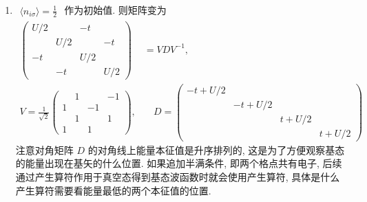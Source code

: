 \documentclass[../../main.tex]{subfiles}
\begin{document}
\begin{enumerate}
  \item $\begin{aligned}
    \langle n_{i\sigma}\rangle = \frac{1}{2}
  \end{aligned}$ 作为初始值. 则矩阵变为
  \begin{align*}
    \begin{pmatrix}
      U/2 &  & -t & \\
       & U/2 & & -t\\
      -t & & U/2 &  \\
       & -t &  & U/2
    \end{pmatrix} &= VDV^{-1},\\
    V = \frac{1}{\sqrt{2}}\begin{pmatrix}
        & 1 &    & -1\\
      1 &   & -1 &   \\
        & 1 &    &  1\\
      1 &   & 1  &
    \end{pmatrix},&\quad D = \begin{pmatrix}
      -t + U/2 &  &  & \\
       & -t + U/2 & & \\
       & & t + U/2 &  \\
       & & & t + U/2
    \end{pmatrix}
  \end{align*}
  注意对角矩阵 $D$ 的对角线上能量本征值是升序排列的, 这是为了方便观察基态的能量出现在基矢的什么位置. 如果追加半满条件, 即两个格点共有{\color{red}{两个}}电子, 后续通过产生算符作用于真空态得到基态波函数时就会使用{\color{red}{两个}}产生算符, 具体是什么产生算符需要看能量最低的两个本征值的位置.
  

\end{enumerate}
\end{document}
